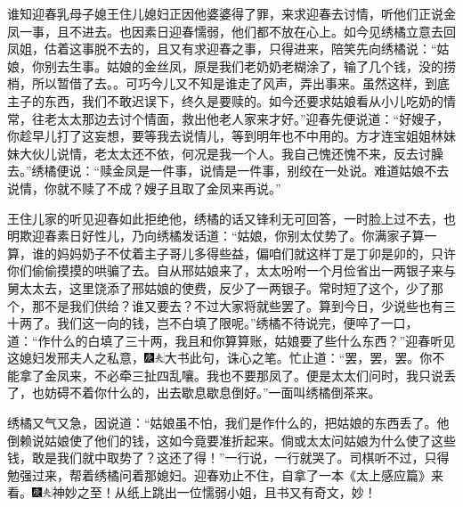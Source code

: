 谁知迎春乳母子媳王住儿媳妇正因他婆婆得了罪，来求迎春去讨情，听他们正说金凤一事，且不进去。也因素日迎春懦弱，他们都不放在心上。如今见绣橘立意去回凤姐，估着这事脱不去的，且又有求迎春之事，只得进来，陪笑先向绣橘说：``姑娘，你别去生事。姑娘的金丝凤，原是我们老奶奶老糊涂了，输了几个钱，没的捞梢，所以暂借了去。。可巧今儿又不知是谁走了风声，弄出事来。虽然这样，到底主子的东西，我们不敢迟误下，终久是要赎的。如今还要求姑娘看从小儿吃奶的情常，往老太太那边去讨个情面，救出他老人家来才好。''迎春先便说道：``好嫂子，你趁早儿打了这妄想，要等我去说情儿，等到明年也不中用的。方才连宝姐姐林妹妹大伙儿说情，老太太还不依，何况是我一个人。我自己愧还愧不来，反去讨臊去。''绣橘便说：``赎金凤是一件事，说情是一件事，别绞在一处说。难道姑娘不去说情，你就不赎了不成？嫂子且取了金凤来再说。''

王住儿家的听见迎春如此拒绝他，绣橘的话又锋利无可回答，一时脸上过不去，也明欺迎春素日好性儿，乃向绣橘发话道：``姑娘，你别太仗势了。你满家子算一算，谁的妈妈奶子不仗着主子哥儿多得些益，偏咱们就这样丁是丁卯是卯的，只许你们偷偷摸摸的哄骗了去。自从邢姑娘来了，太太吩咐一个月俭省出一两银子来与舅太太去，这里饶添了邢姑娘的使费，反少了一两银子。常时短了这个，少了那个，那不是我们供给？谁又要去？不过大家将就些罢了。算到今日，少说些也有三十两了。我们这一向的钱，岂不白填了限呢。''绣橘不待说完，便啐了一口，道：``作什么的白填了三十两，我且和你算算账，姑娘要了些什么东西？''迎春听见这媳妇发邢夫人之私意，{\includegraphics[width=3mm]{../Images/00004}\includegraphics[width=3mm]{../Images/00012}\footnotesize \kaishu 大书此句，诛心之笔。}忙止道：``罢，罢，罢。你不能拿了金凤来，不必牵三扯四乱嚷。我也不要那凤了。便是太太们问时，我只说丢了，也妨碍不着你什么的，出去歇息歇息倒好。''一面叫绣橘倒茶来。

绣橘又气又急，因说道：``姑娘虽不怕，我们是作什么的，把姑娘的东西丢了。他倒赖说姑娘使了他们的钱，这如今竟要准折起来。倘或太太问姑娘为什么使了这些钱，敢是我们就中取势了？这还了得！''一行说，一行就哭了。司棋听不过，只得勉强过来，帮着绣橘问着那媳妇。迎春劝止不住，自拿了一本《太上感应篇》来看。{\includegraphics[width=3mm]{../Images/00004}\includegraphics[width=3mm]{../Images/00012}\footnotesize \kaishu 神妙之至！从纸上跳出一位懦弱小姐，且书又有奇文，妙！}


